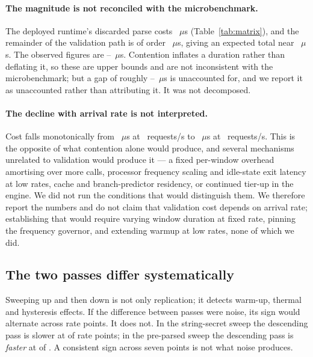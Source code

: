 \documentclass[pdflatex,sn-basic,twocolumn]{sn-jnl}%
\begin{document}
\paragraph{The magnitude is not reconciled with the microbenchmark.} The deployed
runtime's discarded parse costs \NodeEighteenProbeThrows~$\mu$s
(Table~\ref{tab:matrix}), and the remainder of the validation path is of order
\NodeEighteenJwtPreparsed~$\mu$s, giving an expected total near
\InsituPredictedFromMatrix~$\mu$s. The observed figures are
\InsituObservedLo--\InsituObservedHi~$\mu$s. Contention inflates a duration
rather than deflating it, so these are upper bounds and are not inconsistent
with the microbenchmark; but a gap of roughly
\InsituUnaccountedLo--\InsituUnaccountedHi~$\mu$s is unaccounted for, and we
report it as unaccounted rather than attributing it. It was not decomposed.

\paragraph{The decline with arrival rate is not interpreted.} Cost falls
monotonically from \InsituStringAscA~$\mu$s at \InsituRateA~requests/s to
\InsituStringAscG~$\mu$s at \InsituRateG~requests/s. This is the opposite of what
contention alone would produce, and several mechanisms unrelated to validation
would produce it --- a fixed per-window overhead amortising over more calls,
processor frequency scaling and idle-state exit latency at low rates, cache and
branch-predictor residency, or continued tier-up in the engine. We did not run
the conditions that would distinguish them. We therefore report the numbers and
do not claim that validation cost depends on arrival rate; establishing that
would require varying window duration at fixed rate, pinning the frequency
governor, and extending warmup at low rates, none of which we did.

\subsection{The two passes differ systematically}\label{sec:drift}

Sweeping up and then down is not only replication; it detects warm-up, thermal
and hysteresis effects. If the difference between passes were noise, its sign
would alternate across rate points. It does not. In the string-secret sweep the
descending pass is slower at \InsituStringSameSign{} of \InsituStringPoints{}
rate points; in the pre-parsed sweep the descending pass is \emph{faster} at
\InsituPreparsedSameSign{} of \InsituPreparsedPoints. A consistent sign across
seven points is not what noise produces.
\end{document}
